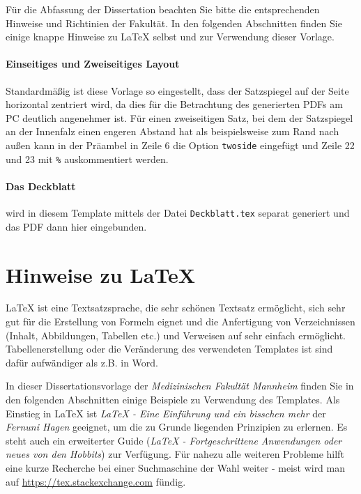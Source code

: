 \documentclass{scrreprt}
\begin{document}
Für die Abfassung der Dissertation beachten Sie bitte die entsprechenden Hinweise und Richtinien der Fakultät. In den folgenden Abschnitten finden Sie einige knappe Hinweise zu LaTeX selbst und zur Verwendung dieser Vorlage. 

\paragraph{Einseitiges und Zweiseitiges Layout}
Standardmäßig ist diese Vorlage so eingestellt, dass der Satzspiegel auf der Seite horizontal zentriert wird, da dies für die Betrachtung des generierten PDFs am PC deutlich angenehmer ist. Für einen zweiseitigen Satz, bei dem der Satzspiegel an der Innenfalz einen engeren Abstand hat als beispielsweise zum Rand nach außen kann in der Präambel in Zeile 6 die Option \verb|twoside| eingefügt und Zeile 22 und 23 mit \verb|%| auskommentiert werden. 

\paragraph{Das Deckblatt} wird in diesem Template mittels der Datei \verb|Deckblatt.tex| separat generiert und das PDF dann hier eingebunden. 

\section{Hinweise zu \LaTeX}
\par{\LaTeX} ist eine Textsatzsprache, die sehr schönen Textsatz ermöglicht, sich sehr gut für die Erstellung von Formeln eignet und die Anfertigung von Verzeichnissen (Inhalt, Abbildungen, Tabellen etc.) und Verweisen auf sehr einfach ermöglicht. Tabellenerstellung oder die Veränderung des verwendeten Templates ist sind dafür aufwändiger als z.B. in Word. 

In dieser Dissertationsvorlage der \textit{Medizinischen Fakultät Mannheim} finden Sie in den folgenden Abschnitten einige Beispiele zu Verwendung des Templates. Als Einstieg in LaTeX  ist  \textit{LaTeX - Eine Einführung und ein bisschen mehr} \cite{LaTeX_Guide_1} der \textit{Fernuni Hagen} geeignet, um die zu Grunde liegenden Prinzipien zu erlernen. Es steht auch ein erweiterter Guide (\textit{LaTeX - Fortgeschrittene Anwendungen oder neues von den Hobbits}) \cite{LaTeX_Guide_2} zur Verfügung. Für nahezu alle weiteren Probleme hilft eine kurze Recherche bei einer Suchmaschine der Wahl weiter - meist wird man auf \url{https://tex.stackexchange.com} fündig. 
\end{document}
